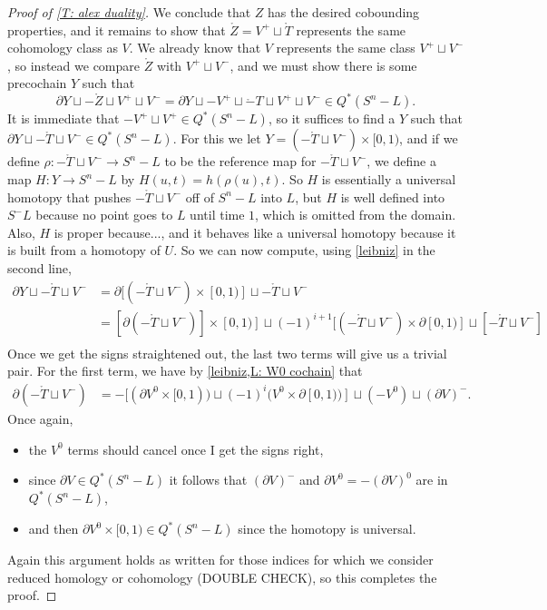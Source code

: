 \documentclass[12pt]{article}
\theoremstyle{plain}
\theoremstyle{definition}
\theoremstyle{remark}
\newcommand{\bd}{\partial}
\begin{document}
\begin{proof}[Proof of \cref{T: alex duality}]
We conclude that $Z$ has the desired cobounding properties, and it remains to show that $\mathring Z
= V^+ \sqcup \mathring T$ represents the same cohomology class as $V$.
We already know that $V$ represents the same class $V^+ \sqcup V^-$, so instead we compare $\mathring Z$ with $V^+ \sqcup V^-$, and we must show there is some precochain $Y$ such that
$$\bd Y \sqcup -\mathring Z\sqcup V^+\sqcup V^- = \bd Y \sqcup -V^+ \sqcup \mathring -T\sqcup V^+\sqcup V^- \in Q^*(S^n-L).$$
It is immediate that $-V^+ \sqcup V^+ \in Q^*(S^n-L)$, so it suffices to find a $Y$ such that
$\bd Y \sqcup -\mathring T \sqcup V^- \in Q^*(S^n-L)$.
For this we let $Y = (-\mathring T \sqcup V^-) \times [0,1)$, and if we define $\rho \colon -\mathring T \sqcup V^- \to S^n -L$ to be the reference map for $-\mathring T \sqcup V^-$, we define a map $H \colon Y \to S^n-L$ by $H(u,t) = h(\rho(u),t)$.
So $H$ is essentially a universal homotopy that pushes $-\mathring T \sqcup V^-$ off of $S^n-L$ into $L$, but $H$ is well defined into $S^-L$ because no point goes to $L$ until time $1$, which is omitted from the domain.
Also, $H$ is proper because..., and it behaves like a universal homotopy because it is built from a homotopy of $U$.
So we can now compute, using \cref{leibniz} in the second line,
\begin{align*}
\bd Y \sqcup -\mathring T \sqcup V^- &=\bd [(-\mathring T \sqcup V^-) \times [0,1)] \sqcup -\mathring T \sqcup V^- \\
&=[\bd(-\mathring T \sqcup V^-)]\times [0,1)] \sqcup (-1)^{i+1}[(-\mathring T \sqcup V^-)\times \bd[0,1)] \sqcup [-\mathring T \sqcup V^-]\\
\end{align*}
Once we get the signs straightened out, the last two terms will give us a trivial pair.
For the first term, we have by \cref{leibniz,L: W0 cochain} that
\begin{align*}
\bd(-\mathring T \sqcup V^-)&= -[(\bd V^0 \times [0,1)) \sqcup (-1)^i (V^0 \times \bd[0,1))] \sqcup (-V^0) \sqcup (\bd V)^-.
\end{align*}
Once again,
\begin{itemize}
\item the $V^0$ terms should cancel once I get the signs right,
\item since $\bd V \in Q^*(S^n-L)$ it follows that $(\bd V)^-$ and $\bd V^0=-(\bd V)^0$ are in $Q^*(S^n-L)$,
\item and then $\bd V^0 \times [0,1) \in Q^*(S^n-L)$ since the homotopy is universal.
\end{itemize}

Again this argument holds as written for those indices for which we consider reduced homology or cohomology (DOUBLE CHECK), so this completes the proof.
\end{proof}
\end{document}
